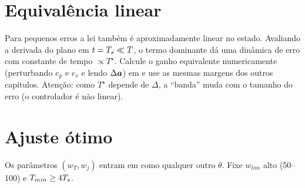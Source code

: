 \section{Equivalência linear}
Para pequenos erros a lei também é aproximadamente linear no estado. Avaliando a
derivada do plano em $t=T_s\ll T$, o termo dominante dá uma dinâmica de erro com
constante de tempo $\propto T^\star$. Calcule o ganho equivalente numericamente
(perturbando $e_p$ e $e_v$ e lendo $\Delta\bm{a}$) em  e
use as mesmas margens dos outros capítulos. Atenção: como $T^\star$ depende de
$\Delta$, a ``banda'' muda com o tamanho do erro (o controlador é não linear).

\section{Ajuste ótimo}
Os parâmetros $(w_T, w_j)$ entram em  como qualquer outro
$\theta$. Fixe $w_{lim}$ alto (50--100) e $T_{min}\ge 4T_s$.

